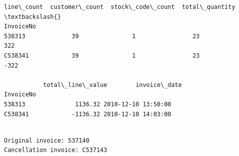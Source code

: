 \documentclass[11pt]{article}
\begin{document}
    
    \begin{Verbatim}[commandchars=\\\{\}]
           line\_count  customer\_count  stock\_code\_count  total\_quantity  \textbackslash{}
InvoiceNo                                                                 
538313             39               1                23             322   
C538341            39               1                23            -322   

           total\_line\_value        invoice\_date  
InvoiceNo                                        
538313              1136.32 2010-12-10 13:50:00  
C538341            -1136.32 2010-12-10 14:03:00  
    \end{Verbatim}

    
    \begin{Verbatim}[commandchars=\\\{\}]

Original invoice: 537140
Cancellation invoice: C537143
    \end{Verbatim}
\end{document}
